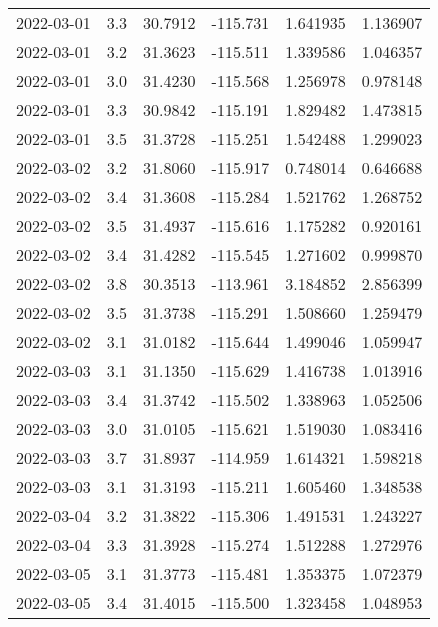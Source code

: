 \begin{tabular}{lrrrrr}
2022-03-01 &       3.3 &  30.7912 &  -115.731 &         1.641935 &         1.136907 \\
2022-03-01 &       3.2 &  31.3623 &  -115.511 &         1.339586 &         1.046357 \\
2022-03-01 &       3.0 &  31.4230 &  -115.568 &         1.256978 &         0.978148 \\
2022-03-01 &       3.3 &  30.9842 &  -115.191 &         1.829482 &         1.473815 \\
2022-03-01 &       3.5 &  31.3728 &  -115.251 &         1.542488 &         1.299023 \\
2022-03-02 &       3.2 &  31.8060 &  -115.917 &         0.748014 &         0.646688 \\
2022-03-02 &       3.4 &  31.3608 &  -115.284 &         1.521762 &         1.268752 \\
2022-03-02 &       3.5 &  31.4937 &  -115.616 &         1.175282 &         0.920161 \\
2022-03-02 &       3.4 &  31.4282 &  -115.545 &         1.271602 &         0.999870 \\
2022-03-02 &       3.8 &  30.3513 &  -113.961 &         3.184852 &         2.856399 \\
2022-03-02 &       3.5 &  31.3738 &  -115.291 &         1.508660 &         1.259479 \\
2022-03-02 &       3.1 &  31.0182 &  -115.644 &         1.499046 &         1.059947 \\
2022-03-03 &       3.1 &  31.1350 &  -115.629 &         1.416738 &         1.013916 \\
2022-03-03 &       3.4 &  31.3742 &  -115.502 &         1.338963 &         1.052506 \\
2022-03-03 &       3.0 &  31.0105 &  -115.621 &         1.519030 &         1.083416 \\
2022-03-03 &       3.7 &  31.8937 &  -114.959 &         1.614321 &         1.598218 \\
2022-03-03 &       3.1 &  31.3193 &  -115.211 &         1.605460 &         1.348538 \\
2022-03-04 &       3.2 &  31.3822 &  -115.306 &         1.491531 &         1.243227 \\
2022-03-04 &       3.3 &  31.3928 &  -115.274 &         1.512288 &         1.272976 \\
2022-03-05 &       3.1 &  31.3773 &  -115.481 &         1.353375 &         1.072379 \\
2022-03-05 &       3.4 &  31.4015 &  -115.500 &         1.323458 &         1.048953 \\

\end{tabular}
